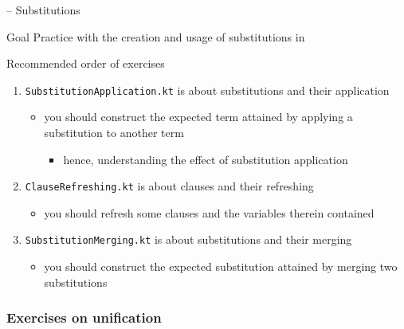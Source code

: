\documentclass[presentation]{beamer}\mode<presentation>{\usetheme{AMSBolognaFC}}
\begin{document}
\begin{frame}{\currentExercise{} -- Substitutions}
    \label{slide:ex-sub}

    \begin{block}{Goal}
        Practice with the creation and usage of substitutions in \twopkt{}
    \end{block}
    \begin{alertblock}{Recommended order of exercises}
        \begin{enumerate}
            \item \texttt{SubstitutionApplication.kt} is about substitutions and their application
            \begin{itemize}
                \item you should construct the expected term attained by applying a substitution to another term
                \begin{itemize}
                    \item hence, understanding the effect of substitution application
                \end{itemize}
            \end{itemize}

            \item \texttt{ClauseRefreshing.kt} is about clauses and their refreshing
            \begin{itemize}
                \item you should refresh some clauses and the variables therein contained
            \end{itemize}

            \item \texttt{SubstitutionMerging.kt} is about substitutions and their merging
            \begin{itemize}
                \item you should construct the expected substitution attained by merging two substitutions
            \end{itemize}
        \end{enumerate}
    \end{alertblock}
\end{frame}

\subsubsection{Exercises on unification}

\startExercise{}
\end{document}
